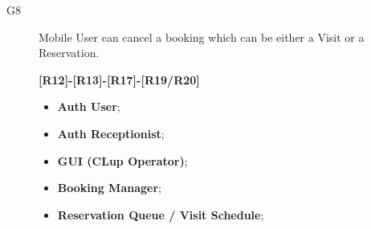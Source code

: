 \begin{description}
    \item[G8]Mobile User can cancel a booking which can be either a Visit or a Reservation.\par
    \textbf{[R12]-[R13]-[R17]-[R19/R20]}
    \begin{itemize}
        \item \textbf{Auth User};
        \item \textbf{Auth Receptionist};
        \item \textbf{GUI (CLup Operator)};  
        \item \textbf{Booking Manager}; 
        \item \textbf{Reservation Queue / Visit Schedule};  
    \end{itemize}
    
\end{description}